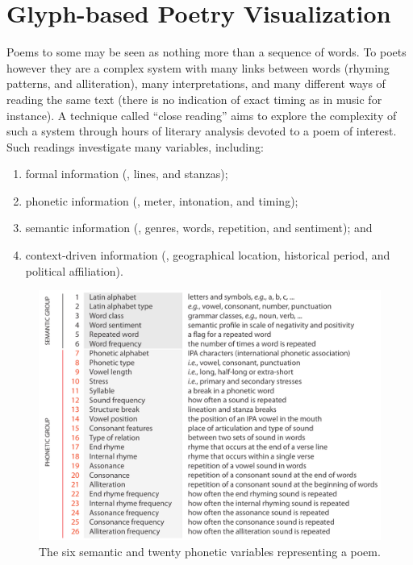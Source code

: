 \chapter{Glyph-based Poetry Visualization}
\label{chap:additional}

Poems to some may be seen as nothing more than a sequence of words.
To poets however they are a complex system with many links between words (\eg rhyming patterns, and alliteration), many interpretations, and many different ways of reading the same text (there is no indication of exact timing as in music for instance).
A technique called ``close reading'' aims to explore the complexity of such a system through hours of literary analysis devoted to a poem of interest. 
Such readings investigate many variables, including: 
\begin{enumerate}
\item formal information (\eg, lines, and stanzas);
\vspace{-2mm}
\item phonetic information (\eg, meter, intonation, and timing);
\vspace{-2mm}
\item semantic information (\eg, genres, words, repetition, and sentiment); and
\vspace{-2mm}
\item context-driven information (\eg, geographical location, historical period, and political affiliation).
\end{enumerate}

\begin{figure}[h!]
\centering
\includegraphics[width=\textwidth]{images/other_glyphs/poem_glyph_vars}
\caption{The six semantic and twenty phonetic variables representing a poem.}
\label{fig:poem_glyph_vars}
\end{figure}


